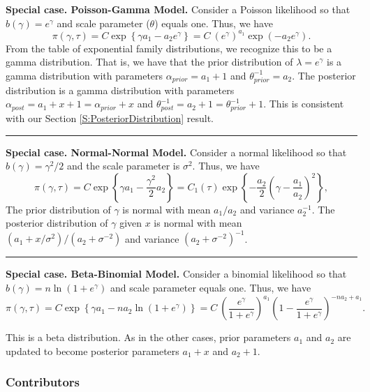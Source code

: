 \documentclass[]{book}
\theoremstyle{definition}
\theoremstyle{definition}
\theoremstyle{definition}
\theoremstyle{remark}
\begin{document}
\textbf{Special case. Poisson-Gamma Model.} Consider a Poisson
likelihood so that \(b(\gamma) = e^{\gamma}\) and scale parameter
(\(\theta\)) equals one. Thus, we have \[
\pi(\gamma,\tau) = C \exp\left\{
\gamma a_1 - a_2 e^{\gamma} \right\}=
C ~ 
\left(
e^{\gamma}\right)^{a_1}
\exp\left(-a_2e^{\gamma} \right).
\] From the table of exponential family distributions, we recognize this
to be a gamma distribution. That is, we have that the prior distribution
of \(\lambda = e^{\gamma}\) is a gamma distribution with parameters
\(\alpha_{prior} = a_1+1\) and \(\theta_{prior}^{-1}=a_2\). The
posterior distribution is a gamma distribution with parameters
\(\alpha_{post} =a_1+x+1=\alpha_{prior}+x\) and
\(\theta_{post}^{-1}=a_2+1 = \theta_{prior}^{-1}+1\). This is consistent
with our Section \ref{S:PosteriorDistribution} result.

\begin{center}\rule{0.5\linewidth}{\linethickness}\end{center}

\textbf{Special case. Normal-Normal Model.} Consider a normal likelihood
so that \(b(\gamma) = \gamma^2/2\) and the scale parameter is
\(\sigma^2\). Thus, we have \[
\pi(\gamma,\tau) = C \exp\left\{
\gamma a_1 - \frac{\gamma^2}{2}a_2\right\}=
C_1(\tau)\exp\left\{ - \frac{a_2}{2}\left(\gamma -\frac{a_1}{a_2}\right)^2\right\},
\] The prior distribution of \(\gamma\) is normal with mean \(a_1/a_2\)
and variance \(a_2^{-1}\). The posterior distribution of \(\gamma\)
given \(x\) is normal with mean \((a_1+x/\sigma^2)/(a_2+\sigma^{-2})\)
and variance \((a_2+\sigma^{-2})^{-1}\).

\begin{center}\rule{0.5\linewidth}{\linethickness}\end{center}

\textbf{Special case. Beta-Binomial Model.} Consider a binomial
likelihood so that \(b(\gamma) = n \ln(1+e^{\gamma})\) and scale
parameter equals one. Thus, we have \[
\pi(\gamma,\tau) = C \exp\left\{
\gamma a_1 - n a_2 \ln(1+e^{\gamma}) \right\}=
C ~ 
\left(
\frac{e^{\gamma}}{1+e^{\gamma}}\right)^{a_1}
\left(1-\frac{e^{\gamma}}{1+e^{\gamma}}\right)^{-na_2+a_1}.
\]

This is a beta distribution. As in the other cases, prior parameters
\(a_1\) and \(a_2\) are updated to become posterior parameters \(a_1+x\)
and \(a_2+1\).

\subsubsection*{Contributors}\label{contributors-8}
\end{document}
